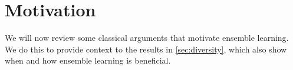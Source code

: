 \documentclass[
	twoside=false, %
]{kaobook}
\begin{document}







\section{Motivation}
\label{sec:ensemble-learning-motivation}

We will now review some classical arguments that motivate ensemble learning. We do this to provide context to the results in \cref{sec:diversity}, which also show when and how ensemble learning is beneficial.
\end{document}
